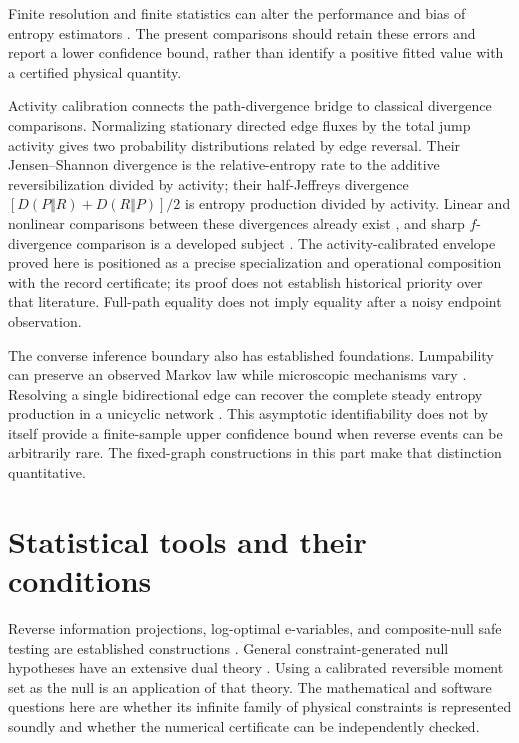 Finite resolution and finite statistics can alter the performance and bias
of entropy estimators \cite{vlFritz2025}. The present comparisons should retain
these errors and report a lower confidence bound, rather than identify a
positive fitted value with a certified physical quantity.

Activity calibration connects the path-divergence bridge to classical
divergence comparisons. Normalizing stationary directed edge fluxes by the
total jump activity gives two probability distributions related by edge
reversal. Their Jensen--Shannon divergence is the relative-entropy rate to
the additive reversibilization divided by activity; their half-Jeffreys
divergence $[D(P\Vert R)+D(R\Vert P)]/2$ is entropy production divided by
activity. Linear and nonlinear comparisons
between these divergences already exist \cite{ciCrooks2008,ciFalasco2022},
and sharp $f$-divergence comparison is a developed subject
\cite{ciGuntuboyina2014}. The activity-calibrated envelope proved here is
positioned as a precise specialization and operational composition with the
record certificate; its proof does not establish historical priority over
that literature. Full-path equality does not imply equality after a noisy
endpoint observation.

The converse inference boundary also has established foundations.
Lumpability can preserve an observed Markov law while microscopic mechanisms
vary \cite{ac_buchholz}. Resolving a single bidirectional edge can recover
the complete steady entropy production in a unicyclic network
\cite[Sec.~V.2]{ciHarunari2022}. This asymptotic identifiability does not by
itself provide a finite-sample upper confidence bound when reverse events
can be arbitrarily rare. The fixed-graph constructions in this part make
that distinction quantitative.

\section{Statistical tools and their conditions}

Reverse information projections, log-optimal e-variables, and composite-null
safe testing are established constructions
\cite{ciGrunwald2024,ciLarsson2025}. General constraint-generated null
hypotheses have an extensive dual theory \cite{ciLarsson2026}. Using a
calibrated reversible moment set as the null is an application of that theory.
The mathematical and software questions here are whether its infinite family
of physical constraints is represented soundly and whether the numerical
certificate can be independently checked.


